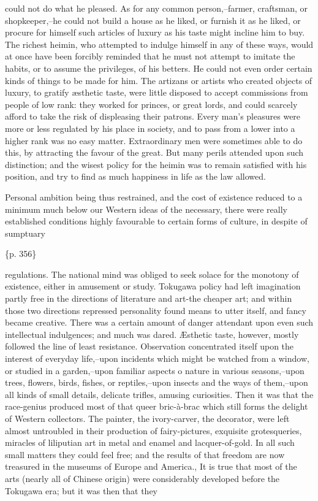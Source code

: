could not do what he pleased. As for any common person,--farmer, craftsman, or shopkeeper,--he could not build a house as he liked, or furnish it as he liked, or procure for himself such articles of luxury as his taste might incline him to buy. The richest heimin, who attempted to indulge himself in any of these ways, would at once have been forcibly reminded that he must not attempt to imitate the habits, or to assume the privileges, of his betters. He could not even order certain kinds of things to be made for him. The artizans or artists who created objects of luxury, to gratify æsthetic taste, were little disposed to accept commissions from people of low rank: they worked for princes, or great lords, and could scarcely afford to take the risk of displeasing their patrons. Every man's pleasures were more or less regulated by his place in society, and to pass from a lower into a higher rank was no easy matter. Extraordinary men were sometimes able to do this, by attracting the favour of the great. But many perils attended upon such distinction; and the wisest policy for the heimin was to remain satisfied with his position, and try to find as much happiness in life as the law allowed.

Personal ambition being thus restrained, and the cost of existence reduced to a minimum much below our Western ideas of the necessary, there were really established conditions highly favourable to certain forms of culture, in despite of sumptuary

\{p. 356\}

regulations. The national mind was obliged to seek solace for the monotony of existence, either in amusement or study. Tokugawa policy had left imagination partly free in the directions of literature and art-the cheaper art; and within those two directions repressed personality found means to utter itself, and fancy became creative. There was a certain amount of danger attendant upon even such intellectual indulgences; and much was dared. Æsthetic taste, however, mostly followed the line of least resistance. Observation concentrated itself upon the interest of everyday life,--upon incidents which might be watched from a window, or studied in a garden,--upon familiar aspects o nature in various seasons,--upon trees, flowers, birds, fishes, or reptiles,--upon insects and the ways of them,--upon all kinds of small details, delicate trifles, amusing curiosities. Then it was that the race-genius produced most of that queer bric-à-brac which still forms the delight of Western collectors. The painter, the ivory-carver, the decorator, were left almost untroubled in their production of fairy-pictures, exquisite grotesqueries, miracles of liliputian art in metal and enamel and lacquer-of-gold. In all such small matters they could feel free; and the results of that freedom are now treasured in the museums of Europe and America., It is true that most of the arts (nearly all of Chinese origin) were considerably developed before the Tokugawa era; but it was then that they

